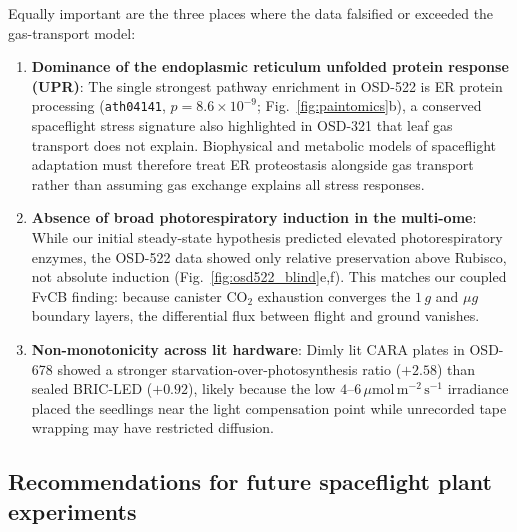 \documentclass[10pt,twocolumn,a4paper]{article}
\newcommand{\ums}{\ensuremath{\mu\mathrm{mol\,m^{-2}\,s^{-1}}}}
\begin{document}
Equally important are the three places where the data falsified or exceeded the gas-transport model:
\begin{enumerate}
    \item \textbf{Dominance of the endoplasmic reticulum unfolded protein response (UPR)}: The single strongest pathway enrichment in OSD-522 is ER protein processing (\texttt{ath04141}, $p = 8.6\times 10^{-9}$; Fig.~\ref{fig:paintomics}b), a conserved spaceflight stress signature also highlighted in OSD-321 \citep{osd321} that leaf gas transport does not explain. Biophysical and metabolic models of spaceflight adaptation must therefore treat ER proteostasis alongside gas transport rather than assuming gas exchange explains all stress responses.
    \item \textbf{Absence of broad photorespiratory induction in the multi-ome}: While our initial steady-state hypothesis predicted elevated photorespiratory enzymes, the OSD-522 data showed only relative preservation above Rubisco, not absolute induction (Fig.~\ref{fig:osd522_blind}e,f). This matches our coupled FvCB finding: because canister $\mathrm{CO_2}$ exhaustion converges the $1\,g$ and $\mu g$ boundary layers, the differential flux between flight and ground vanishes.
    \item \textbf{Non-monotonicity across lit hardware}: Dimly lit CARA plates in OSD-678 showed a stronger starvation-over-photosynthesis ratio ($+2.58$) than sealed BRIC-LED ($+0.92$), likely because the low $4\text{--}6\,\ums$ irradiance placed the seedlings near the light compensation point while unrecorded tape wrapping may have restricted diffusion.
\end{enumerate}

\subsection*{Recommendations for future spaceflight plant experiments}
\end{document}
